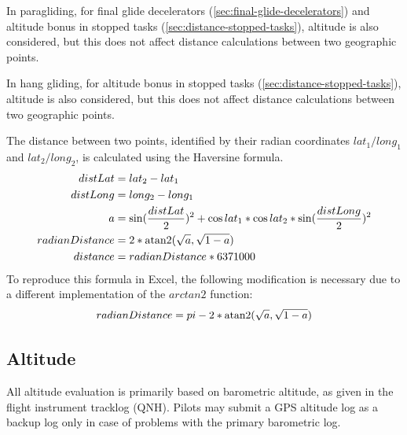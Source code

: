 \documentclass{article}
\begin{document}
\colorbox{pgc}{\begin{minipage}{\textwidth}
In paragliding, for final glide decelerators (\ref{sec:final-glide-decelerators})
and altitude bonus in stopped tasks (\ref{sec:distance-stopped-tasks}), altitude
is also considered, but this does not affect distance calculations between two
geographic points.
\end{minipage}}

\colorbox{hgc}{\begin{minipage}{\textwidth}
In hang gliding, for altitude bonus in stopped tasks (\ref{sec:distance-stopped-tasks}),
altitude is also considered, but this does not affect distance calculations between
two geographic points.
\end{minipage}}

The distance between two points, identified by their radian coordinates
\(lat_1/long_1\) and \(lat_2/long_2\), is calculated using the Haversine formula.
\begin{align*}
    distLat &= lat_2 - lat_1 \\
    distLong &= long_2 - long_1 \\
    a &= \sin(\frac{distLat}{2})^2 + \cos lat_1 * \cos lat_2 * \sin(\frac{distLong}{2})^2 \\
    radianDistance &= 2 * \operatorname{atan2}(\sqrt a, \sqrt{1 - a}) \\
    distance &= radianDistance * 6371000 \\
\end{align*}
To reproduce this formula in Excel, the following modification is necessary due
to a different implementation of the \(arctan2\) function:
\[ radianDistance = pi - 2 * \operatorname{atan2}(\sqrt a, \sqrt{1 - a}) \]

\subsection{Altitude}
All altitude evaluation is primarily based on barometric altitude, as given in
the flight instrument tracklog (QNH). Pilots may submit a GPS altitude log as
a backup log only in case of problems with the primary barometric log.
\end{document}
